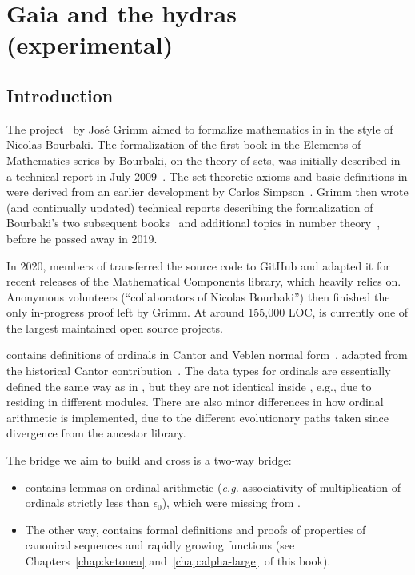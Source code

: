 \chapter{Gaia and the hydras (experimental)}
\label{gaia-chapter}

\section{Introduction}
The \gaia project~\cite{Gaia} by Jos\'e Grimm aimed to formalize mathematics in \coq  in
the style of Nicolas Bourbaki. The formalization of the first book in the
Elements of Mathematics series by Bourbaki, on the theory of sets, was
initially described in a technical report in July 2009~\cite{Grimm2009a}.
The set-theoretic axioms and basic definitions in \gaia were derived
from an earlier development by Carlos Simpson~\cite{Simpson2004,CatsZFCContrib}.
Grimm then wrote (and continually updated) technical reports describing the
formalization of Bourbaki's two subsequent books~\cite{Grimm2009b,Grimm2016}
and additional topics in number theory~\cite{grimm:hal-00911710,Grimm2014},
before he passed away in 2019.

In 2020, members of \community transferred the \gaia source code to
GitHub and adapted it for recent releases of the Mathematical Components
library, which \gaia heavily relies on.
Anonymous volunteers (``collaborators of Nicolas Bourbaki'') then finished
the only in-progress proof left by Grimm. At around 155,000 LOC, \gaia is currently one of the largest maintained open source \coq projects.

\gaia contains definitions of ordinals in Cantor and Veblen normal form~\cite{grimm:hal-00911710}, adapted from the historical Cantor contribution~\cite{CantorContrib}. The data types for ordinals are essentially defined the same way as in \Hydras, but they are not identical inside \coq, e.g., due to residing in different modules. There are also minor differences in how ordinal arithmetic is implemented, due to the different evolutionary paths taken since divergence from the ancestor library.



The bridge we aim to build and cross is a two-way bridge:

\begin{itemize}
\item \gaia contains lemmas on ordinal arithmetic (\emph{e.g.} associativity of multiplication of ordinals strictly less than $\epsilon_0$), which were missing from \Hydras. 
  \item The other way, \Hydras contains formal definitions and proofs of properties of canonical sequences and rapidly growing functions  (see Chapters~\ref{chap:ketonen} and~\ref{chap:alpha-large}~of this book).
  \end{itemize}
  

